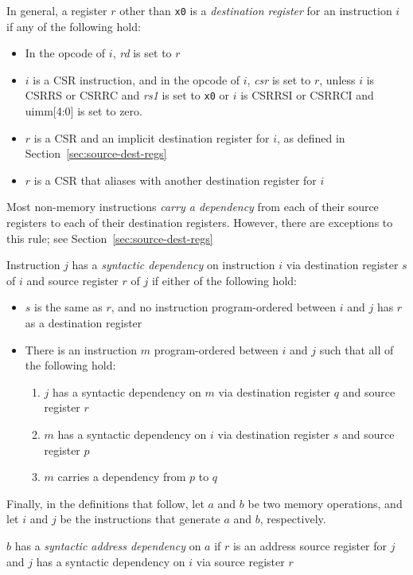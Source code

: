 In general, a register $r$ other than {\tt x0} is a {\em destination register} for an instruction $i$ if any of the following hold:
\begin{itemize}
  \item In the opcode of $i$, {\em rd} is set to $r$
  \item $i$ is a CSR instruction, and in the opcode of $i$, {\em csr} is set to $r$, unless $i$ is CSRRS or CSRRC and {\em rs1} is set to {\tt x0} or $i$ is CSRRSI or CSRRCI and uimm[4:0] is set to zero.
  \item $r$ is a CSR and an implicit destination register for $i$, as defined in Section~\ref{sec:source-dest-regs}
  \item $r$ is a CSR that aliases with another destination register for $i$
\end{itemize}

Most non-memory instructions {\em carry a dependency} from each of their source registers to each of their destination registers.
However, there are exceptions to this rule; see Section~\ref{sec:source-dest-regs}

Instruction $j$ has a {\em syntactic dependency} on instruction $i$ via destination register $s$ of $i$ and source register $r$ of $j$ if either of the following hold:
\begin{itemize}
  \item $s$ is the same as $r$, and no instruction program-ordered between $i$ and $j$ has $r$ as a destination register
  \item There is an instruction $m$ program-ordered between $i$ and $j$ such that all of the following hold:
    \begin{enumerate}
      \item $j$ has a syntactic dependency on $m$ via destination register $q$ and source register $r$
      \item $m$ has a syntactic dependency on $i$ via destination register $s$ and source register $p$
      \item $m$ carries a dependency from $p$ to $q$
    \end{enumerate}
\end{itemize}

Finally, in the definitions that follow, let $a$ and $b$ be two memory operations, and let $i$ and $j$ be the instructions that generate $a$ and $b$, respectively.

$b$ has a {\em syntactic address dependency} on $a$ if $r$ is an address source register for $j$ and $j$ has a syntactic dependency on $i$ via source register $r$

